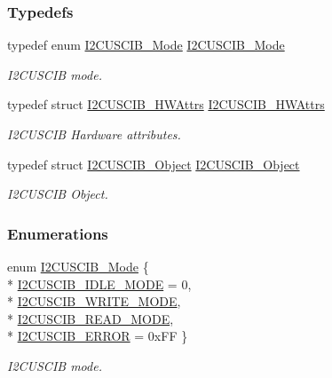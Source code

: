 \subsubsection*{Typedefs}
\begin{DoxyCompactItemize}
\item 
typedef enum \hyperlink{_i2_c_u_s_c_i_b_8h_ad7062f0359995b8833bcc3ca097bc8b1}{I2\+C\+U\+S\+C\+I\+B\+\_\+\+Mode} \hyperlink{_i2_c_u_s_c_i_b_8h_a0aed92306214443ec824ce02e6149251}{I2\+C\+U\+S\+C\+I\+B\+\_\+\+Mode}
\begin{DoxyCompactList}\small\item\em I2\+C\+U\+S\+C\+I\+B mode. \end{DoxyCompactList}\item 
typedef struct \hyperlink{struct_i2_c_u_s_c_i_b___h_w_attrs}{I2\+C\+U\+S\+C\+I\+B\+\_\+\+H\+W\+Attrs} \hyperlink{_i2_c_u_s_c_i_b_8h_a83f30e87604a576ba053bea4686c9569}{I2\+C\+U\+S\+C\+I\+B\+\_\+\+H\+W\+Attrs}
\begin{DoxyCompactList}\small\item\em I2\+C\+U\+S\+C\+I\+B Hardware attributes. \end{DoxyCompactList}\item 
typedef struct \hyperlink{struct_i2_c_u_s_c_i_b___object}{I2\+C\+U\+S\+C\+I\+B\+\_\+\+Object} \hyperlink{_i2_c_u_s_c_i_b_8h_a4b7b87d6ac61e0808fde0cd44bc2aa08}{I2\+C\+U\+S\+C\+I\+B\+\_\+\+Object}
\begin{DoxyCompactList}\small\item\em I2\+C\+U\+S\+C\+I\+B Object. \end{DoxyCompactList}\end{DoxyCompactItemize}
\subsubsection*{Enumerations}
\begin{DoxyCompactItemize}
\item 
enum \hyperlink{_i2_c_u_s_c_i_b_8h_ad7062f0359995b8833bcc3ca097bc8b1}{I2\+C\+U\+S\+C\+I\+B\+\_\+\+Mode} \{ \\*
\hyperlink{_i2_c_u_s_c_i_b_8h_ad7062f0359995b8833bcc3ca097bc8b1a3f5f32dd94a378260e4e6ff3e1a7f497}{I2\+C\+U\+S\+C\+I\+B\+\_\+\+I\+D\+L\+E\+\_\+\+M\+O\+D\+E} = 0, 
\\*
\hyperlink{_i2_c_u_s_c_i_b_8h_ad7062f0359995b8833bcc3ca097bc8b1a2adaf12ff440fd858bfa516c232eea99}{I2\+C\+U\+S\+C\+I\+B\+\_\+\+W\+R\+I\+T\+E\+\_\+\+M\+O\+D\+E}, 
\\*
\hyperlink{_i2_c_u_s_c_i_b_8h_ad7062f0359995b8833bcc3ca097bc8b1ad114cbf93a89a827a72563a239807157}{I2\+C\+U\+S\+C\+I\+B\+\_\+\+R\+E\+A\+D\+\_\+\+M\+O\+D\+E}, 
\\*
\hyperlink{_i2_c_u_s_c_i_b_8h_ad7062f0359995b8833bcc3ca097bc8b1ad31b7d0122eb14a53651cdd89f1802a6}{I2\+C\+U\+S\+C\+I\+B\+\_\+\+E\+R\+R\+O\+R} = 0x\+F\+F
 \}
\begin{DoxyCompactList}\small\item\em I2\+C\+U\+S\+C\+I\+B mode. \end{DoxyCompactList}\end{DoxyCompactItemize}
